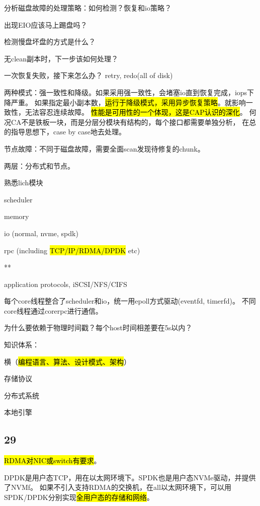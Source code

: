 分析磁盘故障的处理策略：如何检测？恢复和io策略？
\begin{enumbox}
\item 出现EIO应该马上踢盘吗？
\item 检测慢盘坏盘的方式是什么？
\item 无clean副本时，下一步该如何处理？
\item 一次恢复失败，接下来怎么办？ retry, redo(all of disk)
\end{enumbox}

两种模式：强一致性和降级。如果采用强一致性，会堵塞io直到恢复完成，iops下降严重。
如果指定最小副本数，\hl{运行于降级模式，采用异步恢复策略}。就影响一致性，无法容忍连续故障。
\hl{性能是可用性的一个体现，这是CAP认识的深化}。
何况CA不是铁板一块，而是分层分模块有结构的，每个接口都需要单独分析，
在总的指导思想下，case by case地去处理。

节点故障：不同于磁盘故障，需要全面scan发现待修复的chunk。

两层：分布式和节点。

熟悉lich模块
\begin{enumbox}
\item scheduler
\item memory
\item io (normal, nvme, spdk)
\item rpc (including \hl{TCP/IP/RDMA/DPDK} etc)
\item ***
\item application protocols, iSCSI/NFS/CIFS
\end{enumbox}

每个core线程整合了scheduler和io，统一用epoll方式驱动(eventfd, timerfd)。
不同core线程通过corerpc进行通信。

为什么要依赖于物理时间戳？每个host时间相差要在5s以内？

知识体系：
\begin{enumbox}
\item 横（\hl{编程语言、算法、设计模式、架构}）
\item 存储协议
\item 分布式系统
\item 本地引擎
\end{enumbox}

\subsection{29}

\hl{RDMA对NIC或switch有要求}。

DPDK是用户态TCP，用在以太网环境下。SPDK也是用户态NVMe驱动，并提供了NVMf。
如果不引入支持RDMA的交换机，在all以太网环境下，可以用SPDK/DPDK分别实现\hl{全用户态的存储和网络}。

